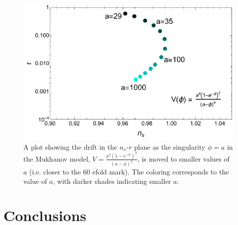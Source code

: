 \documentclass[a4paper,11pt]{article}
\def\nsr{$n_s$-$r$ }
\begin{document}
\begin{figure}[h!]
	\centering
	\includegraphics[width=\textwidth]{figures/Mukhanov.pdf}
	\caption[Drift in \nsr plane for Mukhanov model as the singularity moves to smaller $\phi$.]{A plot showing the drift in the \nsr plane as the singularity $\phi=a$ in the Mukhanov model, $V=\tfrac{a^4(1-e^{-\phi})^2}{(a-\phi)^4}$, is moved to smaller values of $a$ (i.e. closer to the 60 efold mark). The coloring corresponds to the value of $a$, with darker shades indicating smaller $a$.}
	\label{fig:LFP_Rsq_varyaf_drift}
\end{figure}

\FloatBarrier
\newpage
\section{Conclusions}



\newpage


\end{document}
